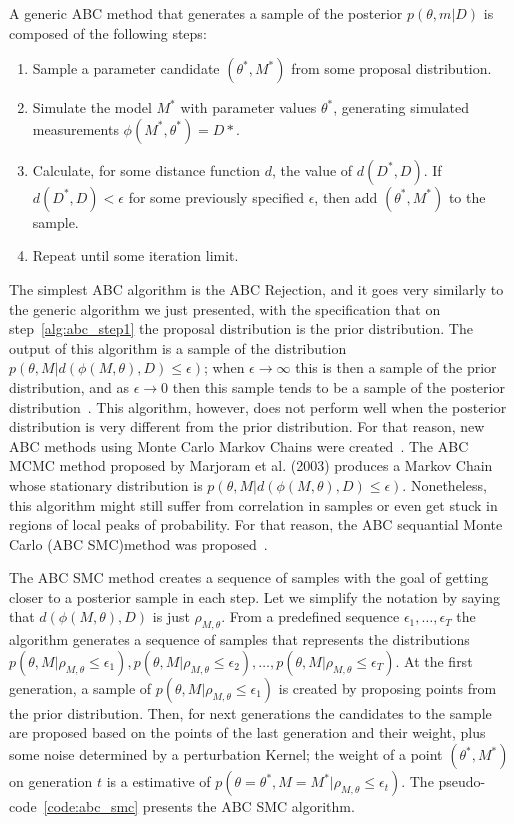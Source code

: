 A generic ABC method that generates a sample of the posterior 
$p (\theta, m | D)$ is composed of the following steps:
\begin{enumerate}
    \item{Sample a parameter candidate $(\theta^*, M^*)$ from some 
        proposal distribution.} \label{alg:abc_step1}
    \item{Simulate the model $M^*$ with parameter values $\theta^*$, 
        generating simulated measurements $\phi (M^*, \theta^*) = D*$.}
    \item{Calculate, for some distance function $d$, the value of
        $d (D^*, D)$. If $d (D^*, D) < \epsilon$ for some previously
        specified $\epsilon$, then add $(\theta^*, M^*)$ to the sample.}
    \item{Repeat until some iteration limit.}
\end{enumerate}

The simplest ABC algorithm is the ABC Rejection, and it goes very 
similarly to the generic algorithm we just presented, with the 
specification that on step~\ref{alg:abc_step1} the proposal distribution
is the prior distribution. The output of this algorithm is a sample of 
the distribution $p (\theta, M| d (\phi (M, \theta), D) \leq \epsilon)$; 
when $\epsilon \to \infty$ this is then a sample of the prior 
distribution, and as $\epsilon \to 0$ then this sample tends to be a
sample of the posterior distribution~\cite{Pritchard1999}. This 
algorithm, however, does not perform well when the posterior 
distribution is very different from the prior distribution. For that 
reason, new ABC methods using Monte Carlo Markov Chains were 
created~\cite{Marjoram2003}. The ABC MCMC method proposed by Marjoram et 
al. (2003) produces a Markov Chain whose stationary distribution is
$p (\theta, M | d (\phi (M, \theta), D) \leq \epsilon)$. Nonetheless, 
this algorithm might still suffer from correlation in samples or even
get stuck in regions of local peaks of probability. For that reason,
the ABC sequantial Monte Carlo (ABC SMC)method was 
proposed~\cite{Toni2009}.

The ABC SMC method creates a sequence of samples with the goal of 
getting closer to a posterior sample in each step. Let we simplify the
notation by saying that $d(\phi (M, \theta), D)$ is just 
$\rho_{M, \theta}$. From a predefined sequence $\epsilon_1, \ldots, 
\epsilon_T$ the algorithm generates a sequence of samples that 
represents the distributions 
$p (\theta, M| \rho_{M, \theta} \leq \epsilon_1), 
p (\theta, M| \rho_{M, \theta} \leq \epsilon_2), \ldots,
p (\theta, M| \rho_{M, \theta} \leq \epsilon_T)$. At the first 
generation, a sample of 
$p (\theta, M| \rho_{M, \theta} \leq \epsilon_1)$ is created by 
proposing points from the prior distribution. Then, for next generations
the candidates to the sample are proposed based on the points of the 
last generation and their weight, plus some noise determined by a 
perturbation Kernel; the weight of a point $(\theta^*, M^*)$ on 
generation $t$ is a estimative of  
$p (\theta = \theta^*, M = M^* | \rho_{M, \theta} \leq \epsilon_t)$. The 
pseudo-code~\ref{code:abc_smc} presents the ABC SMC algorithm.

